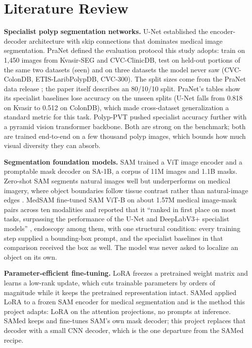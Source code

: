 \documentclass[conference]{IEEEtran}
\begin{document}
\section{Literature Review}\label{sec:2}
\textbf{Specialist polyp segmentation networks.} U-Net \cite{ref1} established the encoder-decoder architecture with skip connections that dominates medical image segmentation. PraNet \cite{ref2} defined the evaluation protocol this study adopts: train on 1,450 images from Kvasir-SEG and CVC-ClinicDB, test on held-out portions of the same two datasets (seen) and on three datasets the model never saw (CVC-ColonDB, ETIS-LaribPolypDB, CVC-300). The split sizes come from the PraNet data release \cite{ref15}; the paper itself describes an 80/10/10 split. PraNet's tables show its specialist baselines lose accuracy on the unseen splits (U-Net falls from 0.818 on Kvasir to 0.512 on ColonDB), which made cross-dataset generalization a standard metric for this task. Polyp-PVT \cite{ref3} pushed specialist accuracy further with a pyramid vision transformer backbone. Both are strong on the benchmark; both are trained end-to-end on a few thousand polyp images, which bounds how much visual diversity they can absorb.

\textbf{Segmentation foundation models.} SAM \cite{ref4} trained a ViT image encoder and a promptable mask decoder on SA-1B, a corpus of 11M images and 1.1B masks. Zero-shot SAM segments natural images well but underperforms on medical imagery, where object boundaries follow tissue contrast rather than natural-image edges \cite{ref5}. MedSAM \cite{ref5} fine-tuned SAM ViT-B on about 1.57M medical image-mask pairs across ten modalities and reported that it ``ranked in first place on most tasks, surpassing the performance of the U-Net and DeepLabV3+ specialist models'' \cite{ref5}, endoscopy among them, with one structural condition: every training step supplied a bounding-box prompt, and the specialist baselines in that comparison received the box as well. The model was never asked to localize an object on its own.

\textbf{Parameter-efficient fine-tuning.} LoRA \cite{ref6} freezes a pretrained weight matrix and learns a low-rank update, which cuts trainable parameters by orders of magnitude while it keeps the pretrained representation intact. SAMed \cite{ref7} applied LoRA to a frozen SAM encoder for medical segmentation and is the method this project adapts: LoRA on the attention projections, no prompts at inference. SAMed keeps and fine-tunes SAM's own mask decoder; this project replaces that decoder with a small CNN decoder, which is the one departure from the SAMed recipe.
\end{document}
